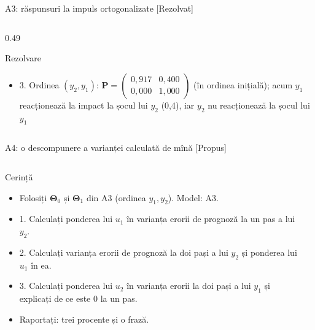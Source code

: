 \begin{frame}{A3: răspunsuri la impuls ortogonalizate [Rezolvat]}
\begin{columns}[T]
\begin{column}{0.49\textwidth}
\begin{exampleblock}{Rezolvare}
\begin{itemize}
    \item 3. Ordinea $(y_2, y_1)$: $\mathbf{P} = \begin{pmatrix} 0{,}917 & 0{,}400 \\ 0{,}000 & 1{,}000 \end{pmatrix}$ (în ordinea inițială); acum $y_1$ reacționează la impact la șocul lui $y_2$ (0,4), iar $y_2$ nu reacționează la șocul lui $y_1$
\end{itemize}
\end{exampleblock}
\end{column}
\end{columns}
\end{frame}

\begin{frame}{A4: o descompunere a varianței calculată de mînă [Propus]}
\propsub
\itemsize{\scriptsize}
\begin{columns}[T]
\begin{column}{\taskw}
\begin{block}{Cerință}
\begin{itemize}
    \item Folosiți $\boldsymbol{\Theta}_0$ și $\boldsymbol{\Theta}_1$ din A3 (ordinea $y_1, y_2$). Model: A3.
    \item 1. Calculați ponderea lui $u_1$ în varianța erorii de prognoză la un pas a lui $y_2$.
    \item 2. Calculați varianța erorii de prognoză la doi pași a lui $y_2$ și ponderea lui $u_1$ în ea.
    \item 3. Calculați ponderea lui $u_2$ în varianța erorii la doi pași a lui $y_1$ și explicați de ce este 0 la un pas.
    \item Raportați: trei procente și o frază.
\end{itemize}
\end{block}
\end{column}
\begin{column}{\solw}
\end{column}
\end{columns}
\end{frame}

